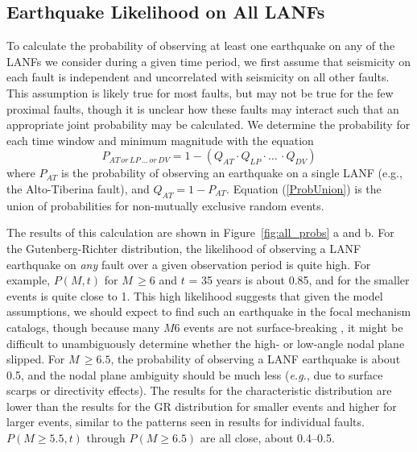\documentclass[twocolumn,grl]{AGUTeX}
\begin{document}
\begin{article}
\subsection{Earthquake Likelihood on All LANFs}
To calculate the probability of observing at least one earthquake on any of the
LANFs we consider during a given time period, we first assume that seismicity
on each fault is independent and uncorrelated with seismicity on all other
faults. This assumption is likely true for most faults, but may not be true for
the few proximal faults, though it is unclear how these faults may interact
such that an appropriate joint probability may be calculated.  We determine the
probability for each time window and minimum magnitude with the equation
\begin{equation}
P_{AT \, or \, LP\, \ldots \, or \, DV} = 1 - (Q_{AT} \cdot Q_{LP} \cdot \ldots \, \cdot Q_{DV})
\label{ProbUnion}
\end{equation}
where $P_{AT}$ is the probability of observing an earthquake on a single LANF
(e.g., the Alto-Tiberina fault), and $Q_{AT} = 1 - P_{AT}$. Equation
(\ref{ProbUnion}) is the union of probabilities for non-mutually exclusive
random events.

The results of this calculation are shown in Figure~\ref{fig:all_probs} a and b.
For the Gutenberg-Richter distribution, the likelihood of observing a LANF
earthquake on \emph{any} fault over a given observation period is quite high.
For example, $P(M,t)$ for $M \, \ge 6$ and $t$ = 35 years is about 0.85, and
for the smaller events is quite close to 1.  This high likelihood suggests that
given the model assumptions, we should expect to find such an earthquake in the
focal mechanism catalogs, though because many $M6$ events are not
surface-breaking \citep{hecker2013eqdist}, it might be difficult to
unambiguously determine whether the high- or low-angle nodal plane slipped.
For $M \, \ge 6.5$, the probability of observing a LANF earthquake is about
0.5, and the nodal plane ambiguity should be much less ({\it e.g.}, due to
surface scarps or directivity effects).  The results for the characteristic
distribution are lower than the results for the GR distribution for smaller
events and higher for larger events, similar to the patterns seen in results
for individual faults. $P(M\ge5.5,t)$ through $P(M\ge6.5)$ are all close, about
0.4--0.5.



\end{article}
\end{document}
